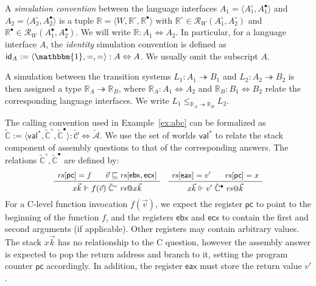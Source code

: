 \documentclass[sigplan,10pt,review]{acmart}
\newcommand{\figsize}{\small}
\newcommand{\kw}[1]{\ensuremath{ \mathsf{#1} }}
\newcommand{\que}{\circ}
\newcommand{\ans}{\bullet}
\begin{document}
\begin{definition} \label{def:simconv} %
A \emph{simulation convention} between the language interfaces
$A_1 = \langle A_1^\que, A_1^\ans \rangle$ and
$A_2 = \langle A_2^\que, A_2^\ans \rangle$
is a tuple $\mathbb{R} = \langle W, \mathbb{R}^\que, \mathbb{R}^\ans \rangle$
with $\mathbb{R}^\que \in \mathcal{R}_W(A_1^\que, A_2^\que)$
and $\mathbb{R}^\ans \in \mathcal{R}_W(A_1^\ans, A_2^\ans)$.
We will write $\mathbb{R} : A_1 \Leftrightarrow A_2$.
In particular,
for a language interface $A$,
the \emph{identity} simulation convention
is defined as
$\kw{id}_A := \langle \mathbbm{1}, {=}, {=} \rangle
  : A \Leftrightarrow A$.
We usually omit the subscript $A$.
\end{definition}

A simulation between the transition systems
$L_1 : A_1 \twoheadrightarrow B_1$ and
$L_2 : A_2 \twoheadrightarrow B_2$
is then assigned a type $\mathbb{R}_A \twoheadrightarrow \mathbb{R}_B$,
where %
$\mathbb{R}_A : A_1 \Leftrightarrow A_2$ and
$\mathbb{R}_B : B_1 \Leftrightarrow B_2$
relate the corresponding language interfaces.
We write
$L_1 \le_{\mathbb{R}_A \twoheadrightarrow \mathbb{R}_B} L_2$.


\begin{example} %
The calling convention used in Example~\ref{ex:abc}
can be formalized as %
$\tilde{\mathbb{C}} :=
  \langle \kw{val}^*, \tilde{\mathbb{C}}^\que, \tilde{\mathbb{C}}^\ans \rangle :
    \tilde{\mathcal{C}} \Leftrightarrow \tilde{\mathcal{A}}$.
We use the set of worlds $\kw{val}^*$
to relate the stack component of
assembly questions to that of the corresponding answers.
The relations $\tilde{\mathbb{C}}^\que, \tilde{\mathbb{C}}^\ans$
are defined by:
\[
  \figsize
  \AxiomC{$\mathit{rs}[\kw{pc}] = f$}
  \AxiomC{\hspace{-1em} $\vec{v} \sqsubseteq \mathit{rs}[\kw{ebx}, \kw{ecx}]$}
  \BinaryInfC{$
    x \vec{k} \Vdash
    f(\vec{v}) \mathrel{\tilde{\mathbb{C}}^\que} \mathit{rs}@ x \vec{k}
  $}
  \DisplayProof
  \quad
  \AxiomC{$\mathit{rs}[\kw{eax}] = v'$}
  \AxiomC{\hspace{-1em} $\mathit{rs}[\kw{pc}] = x$}
  \BinaryInfC{$
    x \vec{k} \Vdash
    v' \mathrel{\tilde{\mathbb{C}}^\ans} \mathit{rs}@\vec{k}
  $}
  \DisplayProof
\]
For a C-level function invocation $f(\vec{v})$,
we expect the register $\kw{pc}$ to point to
the beginning of the function $f$,
and the registers $\kw{ebx}$ and $\kw{ecx}$
to contain the first and second arguments (if applicable).
Other registers may contain arbitrary values.
The stack $x \vec{k}$ has no relationship to the C question,
however the assembly answer is expected to pop the return address
and branch to it, setting the program counter $\kw{pc}$ accordingly.
In addition,
the register $\kw{eax}$
must store
the return value $v'$.
\end{example}
\end{document}
